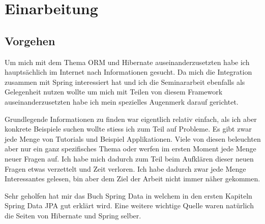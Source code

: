 \chapter{Einarbeitung}
\label{sec:Einarbeitung}

\section{Vorgehen}
Um mich mit dem Thema ORM und Hibernate auseinanderzusetzten habe ich hauptsächlich im Internet nach Informationen gesucht. Da mich die Integration zusammen mit Spring interessiert hat und ich die Seminararbeit ebenfalls als Gelegenheit nutzen wollte um mich mit Teilen von diesem Framework auseinanderzusetzten habe ich mein spezielles Augenmerk darauf gerichtet.

Grundlegende Informationen zu finden war eigentlich relativ einfach, als ich aber konkrete Beispiele suchen wollte stiess ich zum Teil auf Probleme. Es gibt zwar jede Menge von Tutorials und Beispiel Applikationen. Viele von diesen beleuchten aber nur ein ganz spezifisches Thema oder werfen im ersten Moment jede Menge neuer Fragen auf. Ich habe mich dadurch zum Teil beim Aufklären dieser neuen Fragen etwas verzettelt und Zeit verloren. Ich habe dadurch zwar jede Menge Interessantes gelesen, bin aber dem Ziel der Arbeit nicht immer näher gekommen. 

Sehr geholfen hat mir das Buch Spring Data \cite{SpringData} in welchem in den ersten Kapiteln Spring Data JPA gut erklärt wird. Eine weitere wichtige Quelle waren natürlich die Seiten von Hibernate und Spring selber.

